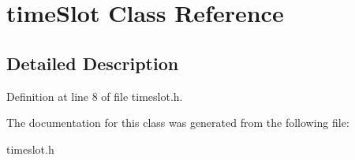 \hypertarget{classtime_slot}{}\section{time\+Slot Class Reference}
\label{classtime_slot}


\subsection{Detailed Description}


Definition at line 8 of file timeslot.\+h.



The documentation for this class was generated from the following file\+:\begin{DoxyCompactItemize}
\item 
timeslot.\+h\end{DoxyCompactItemize}
